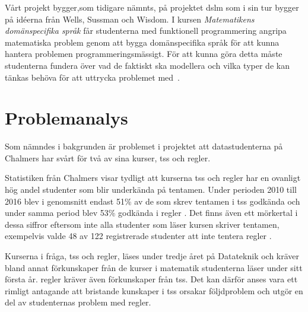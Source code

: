\documentclass[12pt,a4paper,twoside,openright]{article}
\begin{document}
Vårt projekt bygger,som tidigare nämnts, på projektet \gls{dslm} som i
sin tur bygger på idéerna från Wells, Sussman och Wisdom.  I kursen
\textit{Matematikens domänspecifika språk} får studenterna med
funktionell programmering angripa matematiska problem genom att bygga
domänspecifika språk för att kunna hantera problemen
programmeringsmässigt. För att kunna göra detta måste studenterna
fundera över vad de faktiskt ska modellera och vilka typer de kan
tänkas behöva för att uttrycka problemet
med~\cite{kursplan:dslsofmath}.

\newpage

\section{Problemanalys}


Som nämndes i bakgrunden är problemet i projektet att datastudenterna på
Chalmers har svårt för två av sina kurser, \gls{tss} och \gls{regler}.


Statistiken från Chalmers visar tydligt att kurserna \gls{tss} och
\gls{regler} har en ovanligt hög andel studenter som blir underkända
på tentamen. Under perioden 2010 till 2016 blev i genomsnitt endast
51\% av de som skrev tentamen i \gls{tss} godkända och under samma period
blev 53\% godkända i \gls{regler} \cite{tentastatistik}.
Det finns även ett mörkertal i dessa siffror eftersom inte alla
studenter som läser kursen skriver tentamen, exempelvis valde 48 av
122 registrerade studenter att inte tentera \gls{regler}
\cite{kursinformation:ere102:14-15}.

Kurserna i fråga, \gls{tss} och \gls{regler}, läses under tredje året på
Datateknik och kräver bland annat förkunskaper från de kurser i
matematik studenterna läser under sitt första år. \gls{regler} kräver
även förkunskaper från \gls{tss}. Det kan därför anses vara ett rimligt
antagande att bristande kunskaper i \gls{tss} orsakar följdproblem och utgör
en del av studenternas problem med \gls{regler}.
\end{document}
